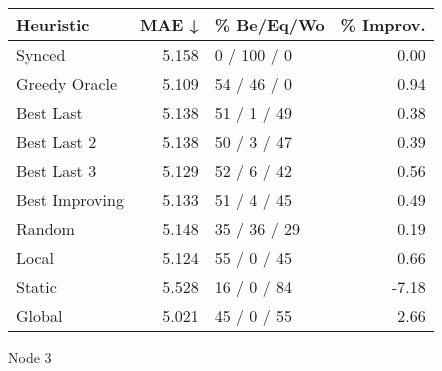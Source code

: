 \begin{tabular}{lrlr}
\toprule
\textbf{Heuristic} & \textbf{MAE ↓} & \textbf{\% Be/Eq/Wo} & \textbf{\% Improv.} \\
\midrule
            Synced &          5.158 &          0 / 100 / 0 &                0.00 \\
     Greedy Oracle &          5.109 &          54 / 46 / 0 &                0.94 \\
         Best Last &          5.138 &          51 / 1 / 49 &                0.38 \\
       Best Last 2 &          5.138 &          50 / 3 / 47 &                0.39 \\
       Best Last 3 &          5.129 &          52 / 6 / 42 &                0.56 \\
    Best Improving &          5.133 &          51 / 4 / 45 &                0.49 \\
            Random &          5.148 &         35 / 36 / 29 &                0.19 \\
             Local &          5.124 &          55 / 0 / 45 &                0.66 \\
            Static &          5.528 &          16 / 0 / 84 &               -7.18 \\
            Global &          5.021 &          45 / 0 / 55 &                2.66 \\
\bottomrule
\end{tabular}
\caption{Node 3}
\label{tab:ds_iid_lr01_le2_bs4_3}
